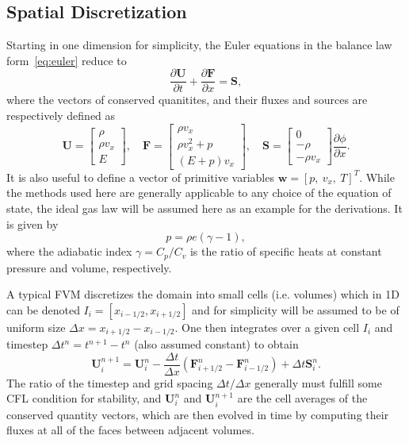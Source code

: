 \subsection{Spatial Discretization}
\label{subsec:space}

Starting in one dimension for simplicity, the Euler equations in the balance law form~\eqref{eq:euler} reduce to
\begin{equation} \label{eq:euler1D}
\frac{\partial \mathbf{U}}{\partial t}+\frac{\partial \mathbf{F}}{\partial x}=\mathbf{S},
\end{equation}
where the vectors of conserved quanitites, and their fluxes and sources are respectively defined as
\begin{equation}
\mathbf{U}=
\begin{bmatrix}
\rho \\ \rho v_x \\ E
\end{bmatrix}
,\quad \mathbf{F}=
\begin{bmatrix}
\rho v_x \\ \rho v_x^2+p \\ (E+p)v_x
\end{bmatrix}
,\quad \mathbf{S}=
\begin{bmatrix}
0 \\ -\rho \\ -\rho v_x
\end{bmatrix} \frac{\partial \phi}{\partial x}.
\end{equation}
It is also useful to define a vector of primitive variables $\mathbf{w}=[p,\ v_x,\ T]^T$. While the methods used here are generally applicable to any choice of the equation of state, the ideal gas law will be assumed here as an example for the derivations. It is given by
\begin{equation}
p=\rho e(\gamma-1),
\end{equation}
where the adiabatic index $\gamma=C_p/C_v$ is the ratio of specific heats at constant pressure and volume, respectively.

A typical FVM discretizes the domain into small cells (i.e. volumes) which in 1D can be denoted $I_i=[x_{i-1/2},x_{i+1/2}]$ and for simplicity will be assumed to be of uniform size $\Delta x=x_{i+1/2}-x_{i-1/2}$. One then integrates over a given cell $I_i$ and timestep $\Delta t^n=t^{n+1}-t^n$ (also assumed constant) to obtain
\begin{equation}
\mathbf{U}_i^{n+1}=\mathbf{U}_i^n-\frac{\Delta t}{\Delta x}\left(\mathbf{F}_{i+1/2}^n-\mathbf{F}_{i-1/2}^n\right)+\Delta t\mathbf{S}_i^n.
\end{equation}
The ratio of the timestep and grid spacing $\Delta t/\Delta x$ generally must fulfill some CFL condition for stability, and $\mathbf{U}_i^n$ and $\mathbf{U}_i^{n+1}$ are the cell averages of the conserved quantity vectors, which are then evolved in time by computing their fluxes at all of the faces between adjacent volumes.

